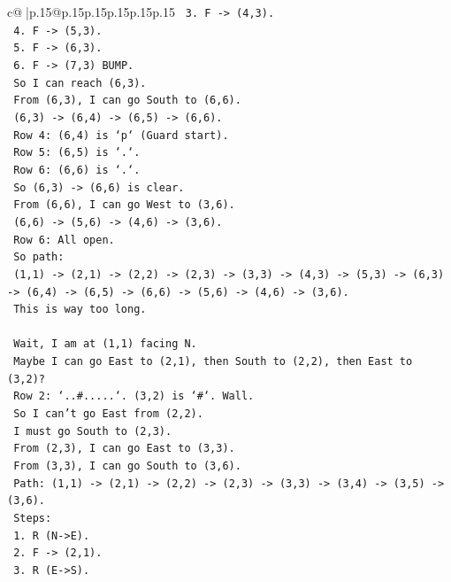 \documentclass{article}
\begin{document}
{\begin{supertabular}{c@{$\;$}|p{.15\linewidth}@{}p{.15\linewidth}p{.15\linewidth}p{.15\linewidth}p{.15\linewidth}p{.15\linewidth}}
{{{\texttt{   3. F {-}> (4,3).} \\
\texttt{   4. F {-}> (5,3).} \\
\texttt{   5. F {-}> (6,3).} \\
\texttt{   6. F {-}> (7,3) BUMP.} \\
\texttt{   So I can reach (6,3).} \\
\texttt{   From (6,3), I can go South to (6,6).} \\
\texttt{   (6,3) {-}> (6,4) {-}> (6,5) {-}> (6,6).} \\
\texttt{   Row 4: (6,4) is `p` (Guard start).} \\
\texttt{   Row 5: (6,5) is `.`.} \\
\texttt{   Row 6: (6,6) is `.`.} \\
\texttt{   So (6,3) {-}> (6,6) is clear.} \\
\texttt{   From (6,6), I can go West to (3,6).} \\
\texttt{   (6,6) {-}> (5,6) {-}> (4,6) {-}> (3,6).} \\
\texttt{   Row 6: All open.} \\
\texttt{   So path:} \\
\texttt{   (1,1) {-}> (2,1) {-}> (2,2) {-}> (2,3) {-}> (3,3) {-}> (4,3) {-}> (5,3) {-}> (6,3) {-}> (6,4) {-}> (6,5) {-}> (6,6) {-}> (5,6) {-}> (4,6) {-}> (3,6).} \\
\texttt{   This is way too long.} \\
\\ 
\texttt{   Wait, I am at (1,1) facing N.} \\
\texttt{   Maybe I can go East to (2,1), then South to (2,2), then East to (3,2)?} \\
\texttt{   Row 2: `..\#.....`. (3,2) is `\#`. Wall.} \\
\texttt{   So I can't go East from (2,2).} \\
\texttt{   I must go South to (2,3).} \\
\texttt{   From (2,3), I can go East to (3,3).} \\
\texttt{   From (3,3), I can go South to (3,6).} \\
\texttt{   Path: (1,1) {-}> (2,1) {-}> (2,2) {-}> (2,3) {-}> (3,3) {-}> (3,4) {-}> (3,5) {-}> (3,6).} \\
\texttt{   Steps:} \\
\texttt{   1. R (N{-}>E).} \\
\texttt{   2. F {-}> (2,1).} \\
\texttt{   3. R (E{-}>S).} \\
}}}
\end{supertabular}}
\end{document}
